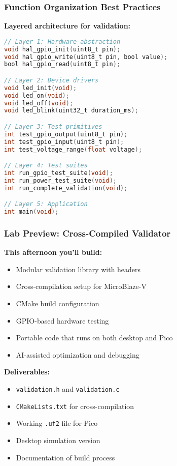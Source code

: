 \documentclass{beamer}
\begin{document}
\begin{frame}[fragile]
\frametitle{Function Organization Best Practices}
\textbf{Layered architecture for validation:}
\begin{lstlisting}[language=C]
// Layer 1: Hardware abstraction
void hal_gpio_init(uint8_t pin);
void hal_gpio_write(uint8_t pin, bool value);
bool hal_gpio_read(uint8_t pin);

// Layer 2: Device drivers
void led_init(void);
void led_on(void);
void led_off(void);
void led_blink(uint32_t duration_ms);

// Layer 3: Test primitives
int test_gpio_output(uint8_t pin);
int test_gpio_input(uint8_t pin);
int test_voltage_range(float voltage);

// Layer 4: Test suites
int run_gpio_test_suite(void);
int run_power_test_suite(void);
int run_complete_validation(void);

// Layer 5: Application
int main(void);
\end{lstlisting}
\end{frame}

\begin{frame}
\frametitle{Lab Preview: Cross-Compiled Validator}
\textbf{This afternoon you'll build:}
\begin{itemize}
    \item Modular validation library with headers
    \item Cross-compilation setup for MicroBlaze-V
    \item CMake build configuration
    \item GPIO-based hardware testing
    \item Portable code that runs on both desktop and Pico
    \item AI-assisted optimization and debugging
\end{itemize}

\vspace{0.5cm}
\textbf{Deliverables:}
\begin{itemize}
    \item \texttt{validation.h} and \texttt{validation.c}
    \item \texttt{CMakeLists.txt} for cross-compilation
    \item Working \texttt{.uf2} file for Pico
    \item Desktop simulation version
    \item Documentation of build process
\end{itemize}
\end{frame}
\end{document}
